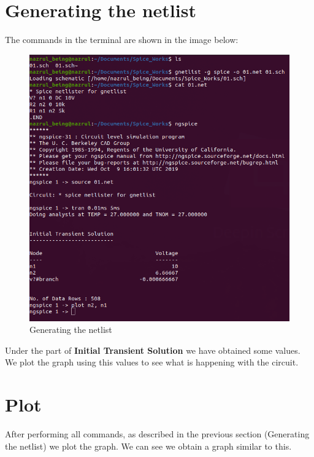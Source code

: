 \documentclass[a4paper,12pt]{article}
\begin{document}
\newpage

\section{Generating the netlist}
The commands in the terminal are shown in the image below:

\begin{figure}[h!]
\centering
\includegraphics[width=1\textwidth]{Terminal.png}
\caption{Generating the netlist}
\end{figure}

Under the part of \textbf{Initial Transient Solution} we have obtained some values. We plot the graph using this values to see what is happening with the circuit.


\section{Plot}
After performing all commands, as described in the previous section (Generating the netlist) we plot the graph. We can see we obtain a graph similar to this.
\end{document}

